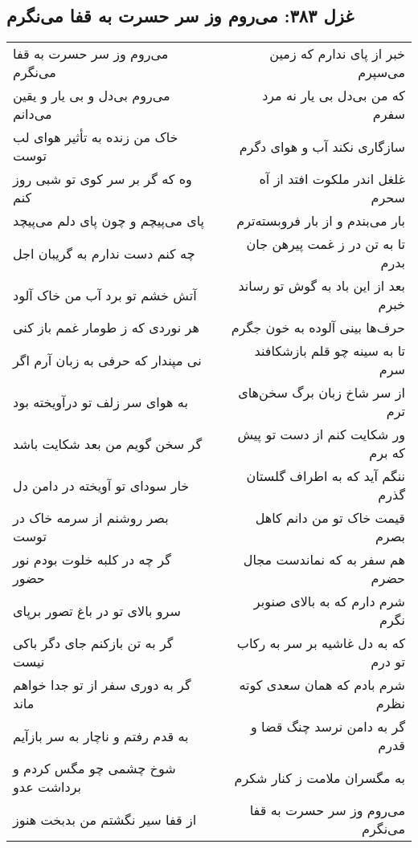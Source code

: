 \begin{center}
\section*{غزل ۳۸۳: می‌روم وز سر حسرت به قفا می‌نگرم}
\label{sec:383}
\begin{longtable}{l p{0.5cm} r}
می‌روم وز سر حسرت به قفا می‌نگرم
&&
خبر از پای ندارم که زمین می‌سپرم
\\
می‌روم بی‌دل و بی یار و یقین می‌دانم
&&
که من بی‌دل بی یار نه مرد سفرم
\\
خاک من زنده به تأثیر هوای لب توست
&&
سازگاری نکند آب و هوای دگرم
\\
وه که گر بر سر کوی تو شبی روز کنم
&&
غلغل اندر ملکوت افتد از آه سحرم
\\
پای می‌پیچم و چون پای دلم می‌پیچد
&&
بار می‌بندم و از بار فروبسته‌ترم
\\
چه کنم دست ندارم به گریبان اجل
&&
تا به تن در ز غمت پیرهن جان بدرم
\\
آتش خشم تو برد آب من خاک آلود
&&
بعد از این باد به گوش تو رساند خبرم
\\
هر نوردی که ز طومار غمم باز کنی
&&
حرف‌ها بینی آلوده به خون جگرم
\\
نی مپندار که حرفی به زبان آرم اگر
&&
تا به سینه چو قلم بازشکافند سرم
\\
به هوای سر زلف تو درآویخته بود
&&
از سر شاخ زبان برگ سخن‌های ترم
\\
گر سخن گویم من بعد شکایت باشد
&&
ور شکایت کنم از دست تو پیش که برم
\\
خار سودای تو آویخته در دامن دل
&&
ننگم آید که به اطراف گلستان گذرم
\\
بصر روشنم از سرمه خاک در توست
&&
قیمت خاک تو من دانم کاهل بصرم
\\
گر چه در کلبه خلوت بودم نور حضور
&&
هم سفر به که نماندست مجال حضرم
\\
سرو بالای تو در باغ تصور برپای
&&
شرم دارم که به بالای صنوبر نگرم
\\
گر به تن بازکنم جای دگر باکی نیست
&&
که به دل غاشیه بر سر به رکاب تو درم
\\
گر به دوری سفر از تو جدا خواهم ماند
&&
شرم بادم که همان سعدی کوته نظرم
\\
به قدم رفتم و ناچار به سر بازآیم
&&
گر به دامن نرسد چنگ قضا و قدرم
\\
شوخ چشمی چو مگس کردم و برداشت عدو
&&
به مگسران ملامت ز کنار شکرم
\\
از قفا سیر نگشتم من بدبخت هنوز
&&
می‌روم وز سر حسرت به قفا می‌نگرم
\\
\end{longtable}
\end{center}
